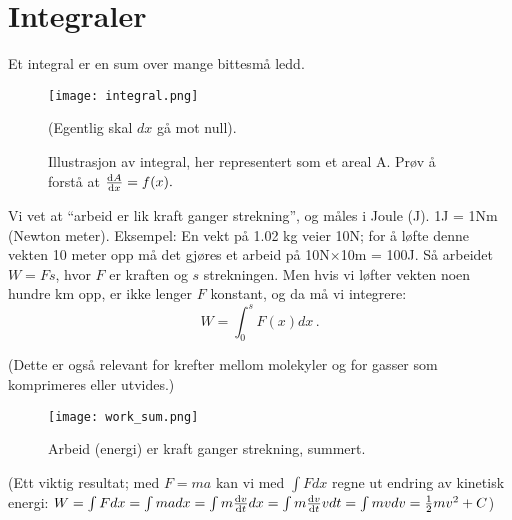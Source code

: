 \documentclass[11pt, A4paper]{article}
\begin{document}
\newpage
\section{Integraler}
Et integral er en sum over mange bittesmå ledd.

\begin{figure}[h]
  \centerline{\texttt{[image: integral.png]}}
  \caption{Illustrasjon av integral, her representert som et areal A. Prøv å forstå at $\dv{A}{x} = f(x).$} (Egentlig skal $dx$ gå mot null).
  \label{fig:interp_example}
\end{figure}


Vi vet at ``arbeid er lik kraft ganger strekning'', og måles i Joule (J). 1J = 1Nm (Newton meter). Eksempel: En vekt på 1.02 kg veier 10N; for å løfte denne vekten 10 meter opp må det gjøres et arbeid på 10N$\times$10m = 100J. Så arbeidet $W=Fs$, hvor $F$ er kraften og $s$ strekningen. Men hvis vi løfter vekten noen hundre km opp, er ikke lenger $F$ konstant, og da må vi integrere:
\begin{equation*}
\label{eq:17}
W=\int_0^s F(x) dx\,.
\end{equation*}

(Dette er også relevant for krefter mellom molekyler og for gasser som komprimeres eller utvides.)


  
\begin{figure}[h]
  \centerline{\texttt{[image: work\_sum.png]}}
  \caption{Arbeid (energi) er kraft ganger strekning, summert.}
  \label{fig:interp_example}
\end{figure}

(Ett viktig resultat; med $F=ma$ kan vi med $\int Fdx$ regne ut endring av kinetisk energi: 
$W = \int F dx = \int ma dx = \int m \dv{v}{t} dx =\int m \dv{v}{t} v dt = \int m v dv = \frac{1}{2} m v^2 + C$)
\end{document}
